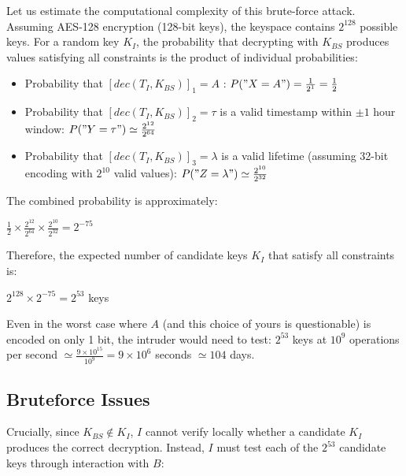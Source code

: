 \documentclass[11pt]{article}
\begin{document}
    Let us estimate the computational complexity of this brute-force attack. Assuming AES-128 encryption (128-bit keys),
    the keyspace contains $2^{128}$ possible keys. For a random key $K_I$, the probability that decrypting with $K_{BS}$ produces
    values satisfying all constraints is the product of individual probabilities:
    \begin{itemize}
        \item Probability that $[dec(T_I, K_{BS})]_1 = A$ : $P( "X=A" ) = \frac{1}{2^1} = \frac{1}{2}$
        \item  Probability that $[dec(T_I, K_{BS})]_2 = \tau$ is a valid timestamp within $\pm1$ hour window: $P("Y = \tau")\simeq \frac{2^{12}}{2^{64}}$
        \item Probability that $[dec(T_I, K_{BS})]_3 = \lambda$ is a valid lifetime (assuming 32-bit encoding with $2^{10}$ valid
                 values): $P("Z = \lambda") \simeq \frac{2^{10}}{2^{32}}$
    \end{itemize}

    The combined probability is approximately:

    \begin{center}
        $\frac{1}{2} \times \frac{2^{12}}{2^{64}} \times \frac{2^{10}}{2^{32}} = 2^{-75}$
    \end{center}

    Therefore, the expected number of candidate keys $K_I$ that satisfy all constraints is:
    \begin{center}
        $2^{128} \times 2^{-75} = 2^{53}$ keys
    \end{center}

    Even in the worst case where $A$ (and this choice of yours is questionable) is encoded on only 1 bit, the intruder
    would need to test: $2^{53}$ keys at $10^9$ operations per second $\simeq \frac{9 \times  10^{15}}{10^9} = 9 \times 10^6$ seconds $\simeq 104$ days.


  


    \subsection{Bruteforce Issues}
    
    Crucially, since $K_{BS} \notin K_I$, $I$ cannot verify locally whether a
    candidate $K_I$ produces the correct decryption. Instead, $I$ must test
    each of the $2^{53}$ candidate keys through interaction with $B$:
\end{document}
